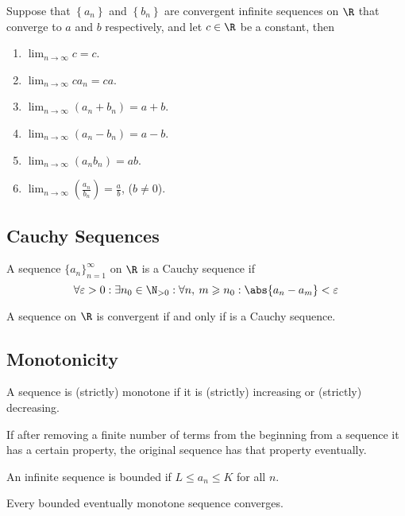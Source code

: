 \documentclass{article}
\begin{document}
\begin{tcolorboxlarge}[title={Limit Laws for Sequences}]
    \begin{theorem}
        Suppose that \(\left\{a_n\right\}\) and \(\left\{b_n\right\}\) are convergent infinite sequences on \(\R\) that converge to \(a\) and \(b\) respectively, and let \(c\in\R\) be a constant, then
        \begin{enumerate}[label=\normalfont\alph*)] %
            \item \(\lim_{n\to\infty}c=c\).
            \item \(\lim_{n\to\infty}ca_n=ca\).
            \item \(\lim_{n\to\infty}\left( a_n + b_n \right)=a+b\).
            \item \(\lim_{n\to\infty}\left( a_n - b_n \right)=a-b\).
            \item \(\lim_{n\to\infty}\left( a_n b_n \right)=ab\).
            \item \(\lim_{n\to\infty}\left( \frac{a_n}{b_n} \right)=\frac{a}{b}\), (\(b\neq 0\)).
        \end{enumerate}
    \end{theorem}
\end{tcolorboxlarge}
%
\subsection{Cauchy Sequences}
\begin{definition}
    A sequence \(\{a_n\}_{n=1}^\infty\) on \(\R\) is a Cauchy sequence if
    \begin{equation*}
        \forall \varepsilon > 0:\exists n_0\in\N_{>0}:\forall n,\: m \geqslant n_0:\abs{a_n-a_m}<\varepsilon
    \end{equation*}
\end{definition}
\begin{theorem}
    A sequence on \(\R\) is convergent if and only if is a Cauchy sequence.
\end{theorem}
\subsection{Monotonicity}
%
\begin{definition}[Monotone]
    A sequence is (strictly) monotone if it is
    (strictly) increasing or (strictly) decreasing.
\end{definition}
%
\begin{definition}[Eventually]
    If after removing a finite number of terms from the beginning from a sequence
    it has a certain property, the original sequence has that property eventually.
\end{definition}
%
\begin{definition}[Bounded]
    An infinite sequence is bounded if \(L \leqslant a_n \leqslant K\) for all \(n\).
\end{definition}
%
\begin{theorem}
    Every bounded eventually monotone sequence converges.
\end{theorem}
%
\end{document}
